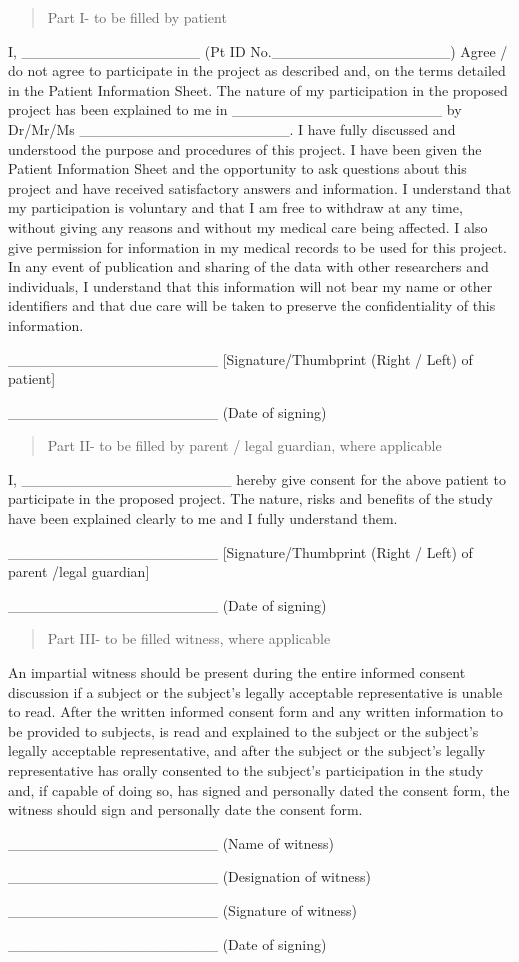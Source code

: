 \begin{quote}
Part I- to be filled by patient
\end{quote}

I, \_\_\_\_\_\_\_\_\_\_\_\_\_\_\_\_\_ (Pt ID
No.\_\_\_\_\_\_\_\_\_\_\_\_\_\_\_\_\_) Agree / do not agree to
participate in the project as described and, on the terms detailed in
the Patient Information Sheet. The nature of my participation in the
proposed project has been explained to me in
\_\_\_\_\_\_\_\_\_\_\_\_\_\_\_\_\_\_\_\_ by Dr/Mr/Ms
\_\_\_\_\_\_\_\_\_\_\_\_\_\_\_\_\_\_\_\_. I have fully discussed and
understood the purpose and procedures of this project. I have been given
the Patient Information Sheet and the opportunity to ask questions about
this project and have received satisfactory answers and information. I
understand that my participation is voluntary and that I am free to
withdraw at any time, without giving any reasons and without my medical
care being affected. I also give permission for information in my
medical records to be used for this project. In any event of publication
and sharing of the data with other researchers and individuals, I
understand that this information will not bear my name or other
identifiers and that due care will be taken to preserve the
confidentiality of this information.

\_\_\_\_\_\_\_\_\_\_\_\_\_\_\_\_\_\_\_\_ {[}Signature/Thumbprint (Right
/ Left) of patient{]}

\_\_\_\_\_\_\_\_\_\_\_\_\_\_\_\_\_\_\_\_ (Date of signing)

\begin{quote}
Part II- to be filled by parent / legal guardian, where applicable
\end{quote}

I, \_\_\_\_\_\_\_\_\_\_\_\_\_\_\_\_\_\_\_\_ hereby give consent for the
above patient to participate in the proposed project. The nature, risks
and benefits of the study have been explained clearly to me and I fully
understand them.

\_\_\_\_\_\_\_\_\_\_\_\_\_\_\_\_\_\_\_\_ {[}Signature/Thumbprint (Right
/ Left) of parent /legal guardian{]}

\_\_\_\_\_\_\_\_\_\_\_\_\_\_\_\_\_\_\_\_ (Date of signing)

\begin{quote}
Part III- to be filled witness, where applicable
\end{quote}

An impartial witness should be present during the entire informed
consent discussion if a subject or the subject's legally acceptable
representative is unable to read. After the written informed consent
form and any written information to be provided to subjects, is read and
explained to the subject or the subject's legally acceptable
representative, and after the subject or the subject's legally
representative has orally consented to the subject's participation in
the study and, if capable of doing so, has signed and personally dated
the consent form, the witness should sign and personally date the
consent form.

\_\_\_\_\_\_\_\_\_\_\_\_\_\_\_\_\_\_\_\_ (Name of witness)

\_\_\_\_\_\_\_\_\_\_\_\_\_\_\_\_\_\_\_\_ (Designation of witness)

\_\_\_\_\_\_\_\_\_\_\_\_\_\_\_\_\_\_\_\_ (Signature of witness)

\_\_\_\_\_\_\_\_\_\_\_\_\_\_\_\_\_\_\_\_ (Date of signing)
